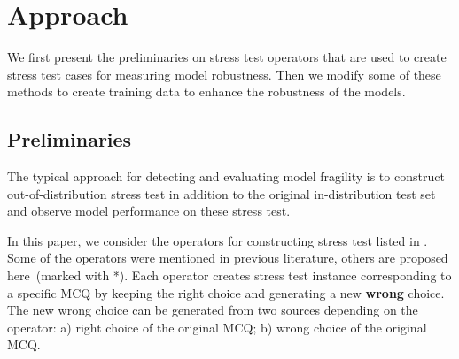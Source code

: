 \section{Approach}

We first present the preliminaries on stress test operators that are used to create stress test cases for measuring model robustness.
Then we modify some of these methods to create
training data to 
enhance the robustness of the models.

\subsection{Preliminaries}
 \label{sec:stressop}
The typical approach for detecting and evaluating model fragility is to construct out-of-distribution stress test in addition to the original in-distribution test set and observe model performance on these stress test.

In this paper, we consider the operators for constructing stress test listed in . Some of the operators were mentioned in previous literature, others are proposed here~(marked with *). Each operator creates stress test instance corresponding to a specific MCQ by keeping the right choice and generating a new \textbf{wrong} choice. The new wrong choice can be generated from 
two sources depending on the operator: a) right choice of the original MCQ; 
b) wrong choice of the original MCQ.

